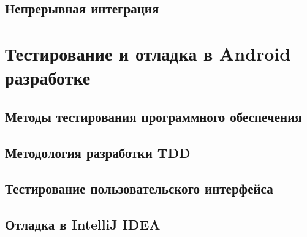 \subsection{Непрерывная интеграция}
\label{subsec:ci}


\section{Тестирование и отладка в Android разработке}
\label{sec:testing}

\subsection{Методы тестирования программного обеспечения}
\label{subsec:testing:methods}

\subsection{Методология разработки TDD}
\label{subsec:testing:tdd}

\subsection{Тестирование пользовательского интерфейса}
\label{subsec:testing:ui}

\subsection{Отладка в IntelliJ IDEA}
\label{subsec:debug}

\conclusions
\label{sec:techConclusions}
